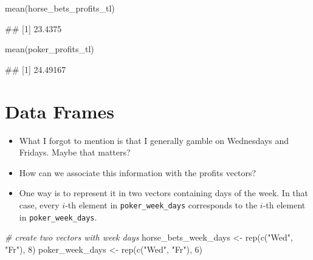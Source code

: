 \documentclass[
]{book}
\newenvironment{Shaded}{\begin{snugshade}}{\end{snugshade}}
\newcommand{\CommentTok}[1]{\textcolor[rgb]{0.56,0.35,0.01}{\textit{#1}}}
\newcommand{\DecValTok}[1]{\textcolor[rgb]{0.00,0.00,0.81}{#1}}
\newcommand{\FunctionTok}[1]{\textcolor[rgb]{0.00,0.00,0.00}{#1}}
\newcommand{\NormalTok}[1]{#1}
\newcommand{\OtherTok}[1]{\textcolor[rgb]{0.56,0.35,0.01}{#1}}
\newcommand{\StringTok}[1]{\textcolor[rgb]{0.31,0.60,0.02}{#1}}
\providecommand{\tightlist}{%
  \setlength{\itemsep}{0pt}\setlength{\parskip}{0pt}}
\begin{document}
\begin{Shaded}
\begin{Highlighting}[]
\FunctionTok{mean}\NormalTok{(horse\_bets\_profits\_tl)}
\end{Highlighting}
\end{Shaded}

\begin{Shaded}
\begin{Highlighting}[]
\NormalTok{\#\# [1] 23.4375}
\end{Highlighting}
\end{Shaded}

\begin{Shaded}
\begin{Highlighting}[]
\FunctionTok{mean}\NormalTok{(poker\_profits\_tl)}
\end{Highlighting}
\end{Shaded}

\begin{Shaded}
\begin{Highlighting}[]
\NormalTok{\#\# [1] 24.49167}
\end{Highlighting}
\end{Shaded}

\hypertarget{data-frames}{%
\section{Data Frames}\label{data-frames}}

\begin{itemize}
\tightlist
\item
  What I forgot to mention is that I generally gamble on Wednesdays and Fridays. Maybe that matters?
\item
  How can we associate this information with the profits vectors?
\end{itemize}

\begin{itemize}
\tightlist
\item
  One way is to represent it in two vectors containing days of the week. In that case, every \(i\)-th element in \texttt{poker\_week\_days} corresponds to the \(i\)-th element in \texttt{poker\_week\_days}.
\end{itemize}

\begin{Shaded}
\begin{Highlighting}[]
\CommentTok{\# create two vectors with week days}
\NormalTok{horse\_bets\_week\_days }\OtherTok{\textless{}{-}} \FunctionTok{rep}\NormalTok{(}\FunctionTok{c}\NormalTok{(}\StringTok{"Wed"}\NormalTok{, }\StringTok{"Fr"}\NormalTok{), }\DecValTok{8}\NormalTok{)}
\NormalTok{poker\_week\_days }\OtherTok{\textless{}{-}} \FunctionTok{rep}\NormalTok{(}\FunctionTok{c}\NormalTok{(}\StringTok{"Wed"}\NormalTok{, }\StringTok{"Fr"}\NormalTok{), }\DecValTok{6}\NormalTok{)}
\end{Highlighting}
\end{Shaded}
\end{document}
